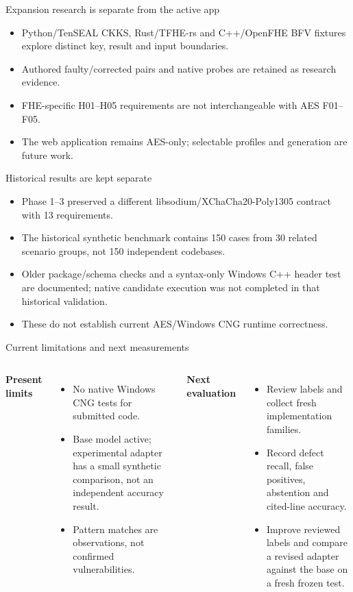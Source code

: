 \documentclass[aspectratio=169,10pt]{beamer}
\begin{document}
\begin{frame}{Expansion research is separate from the active app}
\begin{itemize}
\item Python/TenSEAL CKKS, Rust/TFHE-rs and C++/OpenFHE BFV fixtures explore distinct key, result and input boundaries.
\item Authored faulty/corrected pairs and native probes are retained as research evidence.
\item FHE-specific H01--H05 requirements are not interchangeable with AES F01--F05.
\item The web application remains AES-only; selectable profiles and generation are future work.
\end{itemize}
\end{frame}

\begin{frame}{Historical results are kept separate}
\begin{itemize}
\item Phase 1--3 preserved a different libsodium/XChaCha20-Poly1305 contract with 13 requirements.
\item The historical synthetic benchmark contains 150 cases from 30 related scenario groups, not 150 independent codebases.
\item Older package/schema checks and a syntax-only Windows C++ header test are documented; native candidate execution was not completed in that historical validation.
\item These do not establish current AES/Windows CNG runtime correctness.
\end{itemize}
\end{frame}

\begin{frame}{Current limitations and next measurements}
\begin{columns}[T]
\textbf{Present limits}
\begin{itemize}
\item No native Windows CNG tests for submitted code.
\item Base model active; experimental adapter has a small synthetic comparison, not an independent accuracy result.
\item Pattern matches are observations, not confirmed vulnerabilities.
\end{itemize}
\textbf{Next evaluation}
\begin{itemize}
\item Review labels and collect fresh implementation families.
\item Record defect recall, false positives, abstention and cited-line accuracy.
\item Improve reviewed labels and compare a revised adapter against the base on a fresh frozen test.
\end{itemize}
\end{columns}
\end{frame}
\end{document}
